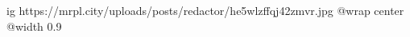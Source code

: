  
 
 
 
 

\ifcmt
  ig https://mrpl.city/uploads/posts/redactor/he5wlzffqj42zmvr.jpg
  @wrap center
  @width 0.9
\fi

